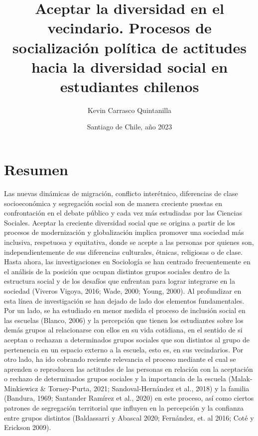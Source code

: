 \documentclass[12pt,twoside]{templates/facsothesis}
\title{Aceptar la diversidad en el vecindario. Procesos de socialización política de actitudes hacia la diversidad social en estudiantes chilenos}
\author{Kevin Carrasco Quintanilla}
\date{Santiago de Chile, año 2023}
\begin{document}

  \maketitle

\frontmatter %
\pagestyle{empty} %



  \setcounter{tocdepth}{1}
  \setlength{\parskip}{0pt}
  \tableofcontents

\setlength\parskip{1em plus 0.1em minus 0.2em}

  \listoftables

  \listoffigures



\mainmatter %
\pagestyle{fancyplain} %

\hypertarget{resumen}{%
\chapter*{Resumen}\label{resumen}}

Las nuevas dinámicas de migración, conflicto interétnico, diferencias de clase socioeconómica y segregación social son de manera creciente puestas en confrontación en el debate público y cada vez más estudiadas por las Ciencias Sociales. Aceptar la creciente diversidad social que se origina a partir de los procesos de modernización y globalización implica promover una sociedad más inclusiva, respetuosa y equitativa, donde se acepte a las personas por quienes son, independientemente de sus diferencias culturales, étnicas, religiosas o de clase. Hasta ahora, las investigaciones en Sociología se han centrado frecuentemente en el análisis de la posición que ocupan distintos grupos sociales dentro de la estructura social y de los desafíos que enfrentan para lograr integrarse en la sociedad (Viveros Vigoya, 2016; Wade, 2000; Young, 2000). Al profundizar en esta línea de investigación se han dejado de lado dos elementos fundamentales. Por un lado, se ha estudiado en menor medida el proceso de inclusión social en las escuelas (Blanco, 2006) y la percepción que tienen los estudiantes sobre los demás grupos al relacionarse con ellos en su vida cotidiana, en el sentido de si aceptan o rechazan a determinados grupos sociales que son distintos al grupo de pertenencia en un espacio externo a la escuela, esto es, en sus vecindarios. Por otro lado, ha ido cobrando reciente relevancia el proceso mediante el cual se aprenden o reproducen las actitudes de las personas en relación con la aceptación o rechazo de determinados grupos sociales y la importancia de la escuela (Malak-Minkiewicz \& Torney-Purta, 2021; Sandoval-Hernández et al., 2018) y la familia (Bandura, 1969; Santander Ramírez et al., 2020) en este proceso, así como ciertos patrones de segregación territorial que influyen en la percepción y la confianza entre grupos distintos (Baldassarri y Abascal 2020; Fernández, et. al 2016; Coté y Erickson 2009).
\end{document}
